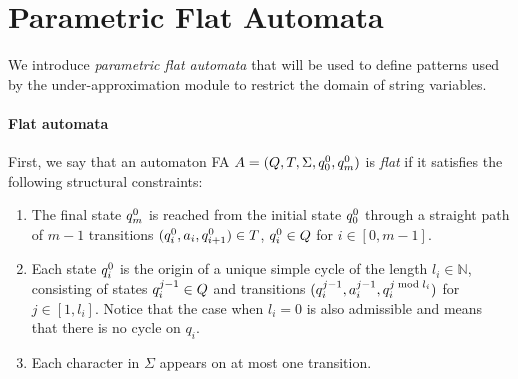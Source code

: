 \documentclass[sigplan,review,anonymous]{acmart}\settopmatter{printfolios=true,printccs=false,printacmref=false}
\begin{document}





\section{Parametric Flat Automata} \label{section:sfa}




We introduce \emph{parametric flat automata} that will be used to define patterns 
used by the under-approximation module to restrict the domain of string variables. 

\paragraph{Flat automata}
First, we say that an automaton FA 
$A = (Q,T,\Sigma,q_{0}^{0},q_{m}^{0})$ is \emph{flat} if it satisfies the following structural constraints:
\begin{enumerate}
	\item The final state $q_{m}^{0}$ is reached from the initial state $q_{0}^{0}$ through a straight path of $m-1$ transitions $(q_{i}^{0},a_i,q_{i+1}^{0}) \in T$, $q_{i}^{0} \in Q$ for $i\in[0,m-1]$. 
	\item 
Each state $q_{i}^{0}$ is the origin of a unique simple cycle of the length $l_i\in\mathbb{N}$, consisting of states $q_{i}^{j-1} \in Q$ and transitions $(q_{i}^{j-1}, a_{i}^{j-1}, q_{i}^{j \bmod l_i})$ for $j\in [1,l_i]$. 
Notice that the case when $l_i = 0$ is also admissible and means that there is no cycle on $q_i$.
	\item Each character in $\Sigma$ appears on at most one transition. 
\end{enumerate} 
\end{document}
